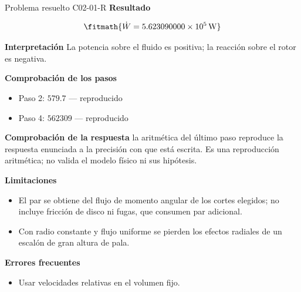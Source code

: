 \documentclass[10pt,openany]{book}
\begin{document}
\begin{studiumworked}{Problema resuelto C02-01-R}
\noindent\textbf{Resultado}

\[
\fitmath{\dot{W}=5.623090000\times10^{5}\,\mathrm{W}}
\]

\noindent\textbf{Interpretación}
La potencia sobre el fluido es positiva; la reacción sobre el rotor es negativa.

\noindent\textbf{Comprobación de los pasos}
\begin{itemize}
\item Paso 2: $579.7$ — reproducido
\item Paso 4: $562309$ — reproducido
\end{itemize}

\noindent\textbf{Comprobación de la respuesta} la aritmética del último paso reproduce la respuesta enunciada a la precisión con que está escrita. Es una reproducción aritmética; no valida el modelo físico ni sus hipótesis.

\noindent\textbf{Limitaciones}
\begin{itemize}
\item El par se obtiene del flujo de momento angular de los cortes elegidos; no incluye fricción de disco ni fugas, que consumen par adicional.
\item Con radio constante y flujo uniforme se pierden los efectos radiales de un escalón de gran altura de pala.
\end{itemize}

\noindent\textbf{Errores frecuentes}
\begin{itemize}
\item Usar velocidades relativas en el volumen fijo.
\end{itemize}
\end{studiumworked}
\end{document}
